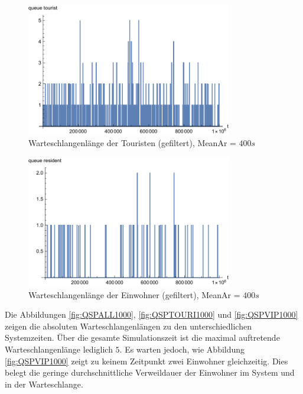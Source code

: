 \begin{figure}[htpb]
	\centering
	\includegraphics[width=0.8\textwidth]{abbildungen/1_Phone_VIP/Arrival_400_Serve_100_dur_1000000_Skip_0/QueueStepPlotTouristFiltered.pdf}
	\caption{Warteschlangenlänge der Touristen (gefiltert), MeanAr = $400s$}
	\label{fig:QSPTOURI400}
\end{figure}

\begin{figure}[htpb]
	\centering
	\includegraphics[width=0.8\textwidth]{abbildungen/1_Phone_VIP/Arrival_400_Serve_100_dur_1000000_Skip_0/QueueStepPlotResidentFiltered.pdf}
	\caption{Warteschlangenlänge der Einwohner (gefiltert), MeanAr = $400s$}
	\label{fig:QSPVIP400}
\end{figure}

Die Abbildungen \ref{fig:QSPALL1000}, \ref{fig:QSPTOURI1000} und \ref{fig:QSPVIP1000} zeigen die absoluten Warteschlangenlängen zu den unterschiedlichen Systemzeiten. Über die gesamte Simulationszeit ist die maximal auftretende Warteschlangenlänge lediglich $5$. Es warten jedoch, wie Abbildung \ref{fig:QSPVIP1000} zeigt zu keinem Zeitpunkt zwei Einwohner gleichzeitig. Dies belegt die geringe durchschnittliche Verweildauer der Einwohner im System und in der Warteschlange.

